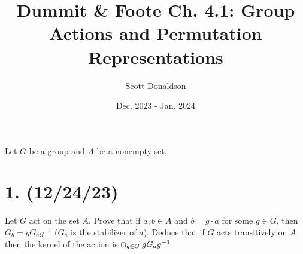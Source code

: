 \documentclass{article}
\title{Dummit \& Foote Ch. 4.1: Group Actions and Permutation Representations}
\author{Scott Donaldson}
\date{Dec. 2023 - Jan. 2024}
\begin{document}
\maketitle

Let $G$ be a group and $A$ be a nonempty set.

\section*{1. (12/24/23)}

Let $G$ act on the set $A$. Prove that if $a, b \in A$ and $b = g \cdot a$ for some $g \in G$, then $G_b = gG_ag^{-1}$ ($G_a$ is the stabilizer of $a$). Deduce that if $G$ acts transitively on $A$ then the kernel of the action is $\cap_{g \in G}\hspace{0.25em}gG_ag^{-1}$.
\end{document}
